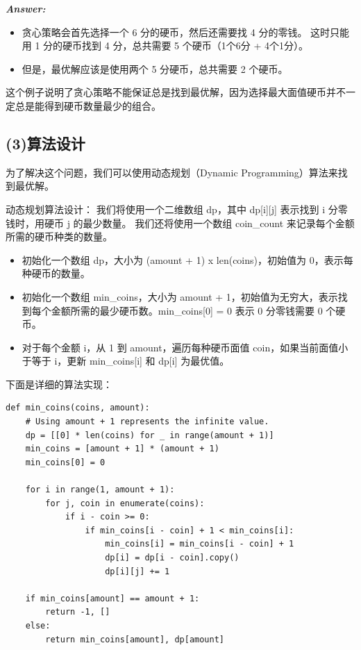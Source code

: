 \documentclass[12pt]{article}
\newenvironment{Answer}{
  \vspace{12pt}
  {\large\textbf{\textit{\hspace{-12pt}Answer:}}}\par
  \vspace{8pt}
} {\vspace{24pt}}
\begin{document}
\begin{Answer}
\begin{itemize}
  \item 贪心策略会首先选择一个 6 分的硬币，然后还需要找 4 分的零钱。
    这时只能用 1 分的硬币找到 4 分，总共需要 5 个硬币（1个6分 + 4个1分）。
  \item 但是，最优解应该是使用两个 5 分硬币，总共需要 2 个硬币。
\end{itemize}

这个例子说明了贪心策略不能保证总是找到最优解，因为选择最大面值硬币并不一定总是能得到硬币数量最少的组合。

\subsection*{(3)算法设计}

为了解决这个问题，我们可以使用动态规划（Dynamic Programming）算法来找到最优解。

动态规划算法设计：
我们将使用一个二维数组 dp，其中 dp[i][j] 表示找到 i 分零钱时，用硬币 j 的最少数量。
我们还将使用一个数组 coin\_count 来记录每个金额所需的硬币种类的数量。

\begin{itemize}
  \item 初始化一个数组 dp，大小为 (amount + 1) x len(coins)，初始值为 0，表示每种硬币的数量。
  \item 初始化一个数组 min\_coins，大小为 amount + 1，初始值为无穷大，表示找到每个金额所需的最少硬币数。min\_coins[0] = 0 表示 0 分零钱需要 0 个硬币。
  \item 对于每个金额 i，从 1 到 amount，遍历每种硬币面值 coin，如果当前面值小于等于 i，更新 min\_coins[i] 和 dp[i] 为最优值。
\end{itemize}

下面是详细的算法实现：

\begin{lstlisting}
def min_coins(coins, amount):
    # Using amount + 1 represents the infinite value.
    dp = [[0] * len(coins) for _ in range(amount + 1)]
    min_coins = [amount + 1] * (amount + 1)
    min_coins[0] = 0

    for i in range(1, amount + 1):
        for j, coin in enumerate(coins):
            if i - coin >= 0:
                if min_coins[i - coin] + 1 < min_coins[i]:
                    min_coins[i] = min_coins[i - coin] + 1
                    dp[i] = dp[i - coin].copy()
                    dp[i][j] += 1

    if min_coins[amount] == amount + 1:
        return -1, []
    else:
        return min_coins[amount], dp[amount]
\end{lstlisting}


\end{Answer}
\end{document}
